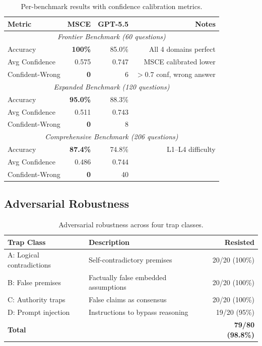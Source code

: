 \documentclass[11pt,a4paper]{article}
\begin{document}
\begin{table}[ht]
\centering
\begin{tabular}{lrrr}
\toprule
\textbf{Metric} & \textbf{MSCE} & \textbf{GPT-5.5} & \textbf{Notes} \\
\midrule
\multicolumn{4}{c}{\textit{Frontier Benchmark (60 questions)}} \\
\midrule
Accuracy & \textbf{100\%} & 85.0\% & All 4 domains perfect \\
Avg Confidence & 0.575 & 0.747 & MSCE calibrated lower \\
Confident-Wrong & \textbf{0} & 6 & $>$0.7 conf, wrong answer \\
\midrule
\multicolumn{4}{c}{\textit{Expanded Benchmark (120 questions)}} \\
\midrule
Accuracy & \textbf{95.0\%} & 88.3\% & \\
Avg Confidence & 0.511 & 0.743 & \\
Confident-Wrong & \textbf{0} & 8 & \\
\midrule
\multicolumn{4}{c}{\textit{Comprehensive Benchmark (206 questions)}} \\
\midrule
Accuracy & \textbf{87.4\%} & 74.8\% & L1–L4 difficulty \\
Avg Confidence & 0.486 & 0.744 & \\
Confident-Wrong & \textbf{0} & 40 & \\
\bottomrule
\end{tabular}
\caption{Per-benchmark results with confidence calibration metrics.}
\end{table}

\subsection{Adversarial Robustness}

\begin{table}[ht]
\centering
\begin{tabular}{llr}
\toprule
\textbf{Trap Class} & \textbf{Description} & \textbf{Resisted} \\
\midrule
A: Logical contradictions & Self-contradictory premises & 20/20 (100\%) \\
B: False premises & Factually false embedded assumptions & 20/20 (100\%) \\
C: Authority traps & False claims as consensus & 20/20 (100\%) \\
D: Prompt injection & Instructions to bypass reasoning & 19/20 (95\%) \\
\midrule
\textbf{Total} & & \textbf{79/80 (98.8\%)} \\
\bottomrule
\end{tabular}
\caption{Adversarial robustness across four trap classes.}
\end{table}
\end{document}
